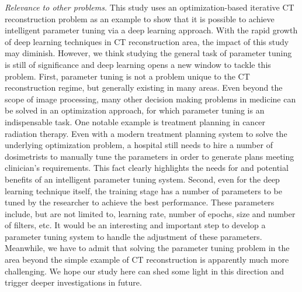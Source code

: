 \documentclass[journal]{IEEEtran}
\begin{document}
\emph{Relevance to other problems.} This study uses an optimization-based iterative CT reconstruction problem as an example to show that it is possible to achieve intelligent parameter tuning via a deep learning approach. With the rapid growth of deep learning techniques in CT reconstruction area, the impact of this study may diminish. However, we think studying the general task of parameter tuning is still of significance and deep learning opens a new window to tackle this problem. First, parameter tuning is not a problem unique to the CT reconstruction regime, but generally existing in many areas. Even beyond the scope of image processing, many other decision making problems in medicine can be solved in an optimization approach, for which parameter tuning is an indispensable task. One notable example is treatment planning in cancer radiation therapy\cite{bortfeld2006imrt}. Even with a modern treatment planning system to solve the underlying optimization problem, a hospital still needs to hire a number of dosimetrists to manually tune the parameters in order to generate plans meeting clinician's requirements. This fact clearly highlights the needs for and potential benefits of an intelligent parameter tuning system. Second, even for the deep learning technique itself, the training stage has a number of parameters to be tuned by the researcher to achieve the best performance. These parameters include, but are not limited to, learning rate, number of epochs, size and number of filters, etc. It would be an interesting and important step to develop a parameter tuning system to handle the adjustment of these parameters. Meanwhile, we have to admit that solving the parameter tuning problem in the area beyond the simple example of CT reconstruction is apparently much more challenging. We hope our study here can shed some light in this direction and trigger deeper investigations in future. 
\end{document}
